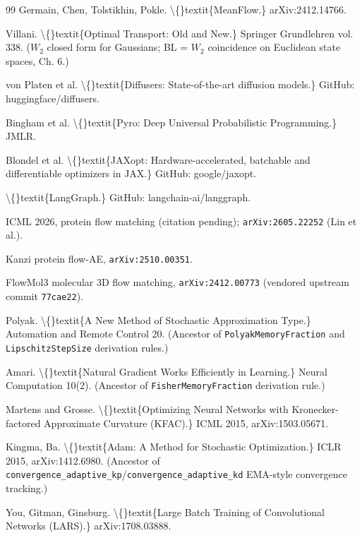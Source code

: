 \documentclass[preprint,3p,times,twocolumn]{elsarticle}
\begin{document}
\begin{thebibliography}{99}
 Germain, Chen, Tolstikhin, Pokle. \textbackslash\{\}textit\{MeanFlow.\} arXiv:2412.14766.

 Villani. \textbackslash\{\}textit\{Optimal Transport: Old and New.\} Springer Grundlehren vol. 338. ($W_2$ closed form for Gaussians; BL = $W_2$ coincidence on Euclidean state spaces, Ch. 6.)

 von Platen et al. \textbackslash\{\}textit\{Diffusers: State-of-the-art diffusion models.\} GitHub: huggingface/diffusers.

 Bingham et al. \textbackslash\{\}textit\{Pyro: Deep Universal Probabilistic Programming.\} JMLR.

 Blondel et al. \textbackslash\{\}textit\{JAXopt: Hardware-accelerated, batchable and differentiable optimizers in JAX.\} GitHub: google/jaxopt.

 \textbackslash\{\}textit\{LangGraph.\} GitHub: langchain-ai/langgraph.

 ICML 2026, protein flow matching (citation pending); \texttt{arXiv:2605.22252} (Lin et al.).

 Kanzi  protein flow-AE, \texttt{arXiv:2510.00351}.

 FlowMol3  molecular 3D flow matching, \texttt{arXiv:2412.00773} (vendored upstream commit \texttt{77cae22}).

 Polyak. \textbackslash\{\}textit\{A New Method of Stochastic Approximation Type.\} Automation and Remote Control 20. (Ancestor of \texttt{PolyakMemoryFraction} and \texttt{LipschitzStepSize} derivation rules.)

 Amari. \textbackslash\{\}textit\{Natural Gradient Works Efficiently in Learning.\} Neural Computation 10(2). (Ancestor of \texttt{FisherMemoryFraction} derivation rule.)

 Martens and Grosse. \textbackslash\{\}textit\{Optimizing Neural Networks with Kronecker-factored Approximate Curvature (KFAC).\} ICML 2015, arXiv:1503.05671.

 Kingma, Ba. \textbackslash\{\}textit\{Adam: A Method for Stochastic Optimization.\} ICLR 2015, arXiv:1412.6980. (Ancestor of \texttt{convergence\_adaptive\_kp}/\texttt{convergence\_adaptive\_kd} EMA-style convergence tracking.)

 You, Gitman, Ginsburg. \textbackslash\{\}textit\{Large Batch Training of Convolutional Networks (LARS).\} arXiv:1708.03888.


\end{thebibliography}
\end{document}
